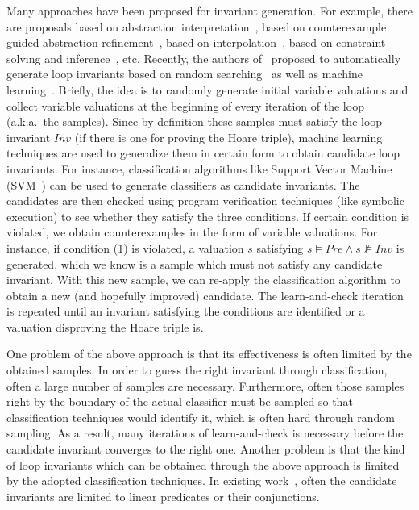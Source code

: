 Many approaches have been proposed for invariant generation. For example, there are proposals based on abstraction interpretation~\cite{cousot1978automatic,mine2006octagon,cousot1979systematic,karr1976affine,vincent2009subpolyhedra}, based on counterexample guided abstraction refinement~\cite{henzinger2003software,thomas2001slam,edmund2003counterexample}, based on interpolation~\cite{kenneth2010lazy,thomas2004abstractions,kenneth2003interpolation,Kenneth2006lazy}, based on constraint solving and inference~\cite{ashutosh2009invgen,michael2003linear,sumit2009constraint}, etc. Recently, the authors of~\cite{sharma2012interpolants,sharma2013verification,sharma2014invariant} proposed to automatically generate loop invariants based on random searching~\cite{sharma2014invariant} as well as machine learning~\cite{sharma2012interpolants}. Briefly, the idea is to randomly generate initial variable valuations and collect variable valuations at the beginning of every iteration of the loop (a.k.a.~the samples). Since by definition these samples must satisfy the loop invariant $\mathit{Inv}$ (if there is one for proving the Hoare triple), machine learning techniques are used to generalize them in certain form to obtain candidate loop invariants. For instance, classification algorithms like Support Vector Machine (SVM~\cite{sharma2012interpolants,sharma2013verification}) can be used to generate classifiers as candidate invariants. The candidates are then checked using program verification techniques (like symbolic execution) to see whether they satisfy the three conditions. If certain condition is violated, we obtain counterexamples in the form of variable valuations. For instance, if condition (1) is violated, a valuation $s$ satisfying $s \models Pre \land s \not \models Inv$ is generated, which we know is a sample which must not satisfy any candidate invariant. With this new sample, we can re-apply the classification algorithm to obtain a new (and hopefully improved) candidate. The learn-and-check iteration is repeated until an invariant satisfying the conditions are identified or a valuation disproving the Hoare triple is.

One problem of the above approach is that its effectiveness is often limited by the obtained samples. In order to guess the right invariant through classification, often a large number of samples are necessary. Furthermore, often those samples right by the boundary of the actual classifier must be sampled so that classification techniques would identify it, which is often hard through random sampling. As a result, many iterations of learn-and-check is  necessary before the candidate invariant converges to the right one. Another problem is that the kind of loop invariants which can be obtained through the above approach is limited by the adopted classification techniques. In existing work~\cite{sharma2012interpolants,sharma2013verification,sharma2014invariant}, often the candidate invariants are limited to linear predicates or their conjunctions.

